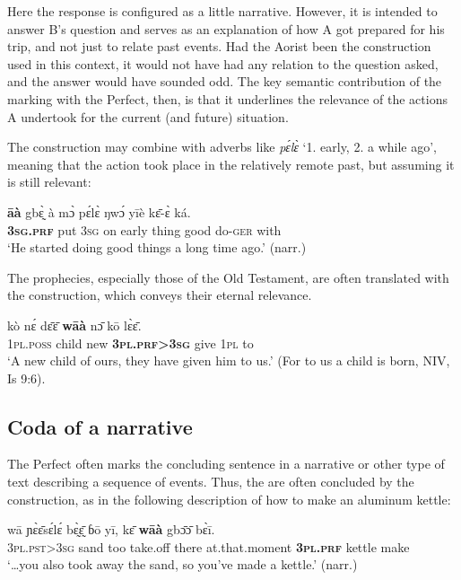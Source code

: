 \documentclass[output=paper,newtxmath,modfonts,nonflat,hidelinks]{langsci/langscibook}
\begin{document}
Here the response is configured as a little narrative. However, it is intended to answer B's question and serves as an explanation of how A got prepared for his trip, and not just to relate past events. Had the Aorist been the construction used in this context, it would not have had any relation to the question asked, and the answer would have sounded odd. The key semantic contribution of the marking with the Perfect, then, is that it underlines the relevance of the actions A undertook for the current (and future) situation.


The  construction may combine with adverbs like \textit{pɛ́lɛ̀} ‘1. early, 2. a while ago’, meaning that the action took place in the relatively remote past, but assuming it is still relevant:

\begin{exe} \ex
\gll 	\textbf{āà}	gbɛ̰̀	à	mɔ̀	pɛ́lɛ̀	ŋwɔ́	yīè	kɛ̄-ɛ̀	ká.\\
	\textbf{3\textsc{sg}.\textsc{prf}}	put	3\textsc{sg}	on	early	thing	good	do-\textsc{ger}	with\\
\glt ‘He started doing good things a long time ago.’ (narr.)
\end{exe}


The prophecies, especially those of the Old Testament, are often translated with the  construction, which conveys their eternal relevance. 

\begin{exe} \ex
\gll 	kò	nɛ́	dɛ̄ɛ̄	\textbf{wāà}	nɔ̄	kō	lɛ̀ɛ̄.\\
	1\textsc{pl}.\textsc{poss}	child	new	\textbf{3\textsc{pl}.\textsc{prf}>3\textsc{sg}}	give	1\textsc{pl}	to	\\
\glt ‘A new child of ours, they have given him to us.’ (For to us a child is born, NIV, Is 9:6).
\end{exe}

\subsection{Coda of a narrative}
\label{khachcodanarr}
The Perfect often marks the concluding sentence in a narrative or other type of text describing a sequence of events. Thus, the  are often concluded by the  construction, as in the following description of how to make an aluminum kettle:

\begin{exe}\ex
\gll {\ldots}wā	ɲɛ̀ɛ̄sɛ́lɛ́	bɛ̰̀ɛ̰̄	ɓō	yī,	kɛ̄	\textbf{wāà}	gbɔ̄ɔ̄	bɛ̀ī.\\
3\textsc{pl}.\textsc{pst}>3\textsc{sg}	sand	too	take.off	there at.that.moment	\textbf{3\textsc{pl}.\textsc{prf}} kettle	make\\
\glt ‘{\ldots}you also took away the sand, so you’ve made a kettle.’ (narr.)
\end{exe}
\end{document}
